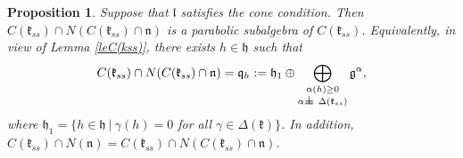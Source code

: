 \documentclass[12pt]{report}
\newtheorem{prop}[theo]{Proposition}
\newcommand {\ZZ} {\mathbb {Z}}
\newcommand{\kk}{\mathfrak{k}}
\newcommand{\nn}{\mathfrak{n}}
\newcommand{\hh}{\mathfrak{h}}
\newcommand{\gG}{\mathfrak{g}}
\newcommand{\bb}{\mathfrak{b}}
\newcommand{\lL}{\mathfrak{l}}
\newcommand{\refle}[1]{Lemma \ref{#1}}
\newcommand{\Cone}{\mathrm{Cone}}
\newcommand{\weights}{\mathrm{Weights}}
\newcommand{\hw}{\mathrm{Sing}}
\def\sperp{{\hbox{$\perp${\hbox{\kern -.77em $-$}\raise-1pt\hbox{\kern -.77em $-$}}\ }}}
\begin{document}
\begin{prop}\label{lePara}
Suppose that $\lL$ satisfies the cone condition. %
Then $C(\kk_{ss})\cap N(C(\kk_{ss})\cap\nn)$ is a parabolic subalgebra of $C(\kk_{ss})$. Equivalently, in view of \refle{leC(kss)}, there exists $h\in\hh$ such that 
\begin{equation}\label{eqPara} 
C(\kk_{ss})\cap N(C(\kk_{ss})\cap\nn)=\mathfrak{q}_h:= \hh_1\oplus\bigoplus_{\substack{\alpha(h)\geq 0\\ \alpha\sperp\Delta(\kk_{ss})}} \gG^{\alpha},
\end{equation} 
where $\hh_1=\{h\in\hh~|~\gamma(h)=0$ for all $ \gamma\in\Delta(\kk)\}$. In addition, $C(\kk_{ss})\cap N(\nn) = C(\kk_{ss})\cap N(C(\kk_{ss}) \cap \nn )$.
\end{prop}
\end{document}
